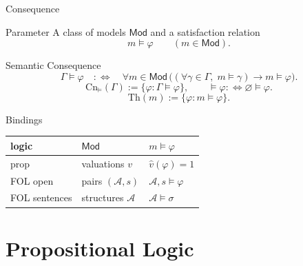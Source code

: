 \documentclass[12pt, a4paper]{report}
\begin{document}
\begin{modelbox}{Consequence}

\begin{modelcomponent}{Parameter}
A class of models \(\mathsf{Mod}\) and a satisfaction relation
\[
  m\models\varphi
  \qquad(m\in\mathsf{Mod}).
\]
\end{modelcomponent}

\begin{modelcomponent}{Semantic Consequence}
\[
  \Gamma\models\varphi
  \quad:\Longleftrightarrow\quad
  \forall m\in\mathsf{Mod}\,
  \bigl((\forall\gamma\in\Gamma,\;m\models\gamma)\to m\models\varphi\bigr).
\]
\[
  \mathrm{Cn}_{\models}(\Gamma):=\{\varphi:\Gamma\models\varphi\},
  \qquad
  \models\varphi:\Longleftrightarrow \varnothing\models\varphi.
\]
\[
  \mathrm{Th}(m):=\{\varphi:m\models\varphi\}.
\]
\end{modelcomponent}

\begin{modelcomponent}{Bindings}
\begin{center}
\begin{tabularx}{\linewidth}{@{}lXX@{}}
\toprule
logic & \(\mathsf{Mod}\) & \(m\models\varphi\) \\
\midrule
prop & valuations \(v\) & \(\widehat v(\varphi)=1\) \\
FOL open & pairs \((\mathcal A,s)\) & \(\mathcal A,s\models\varphi\) \\
FOL sentences & structures \(\mathcal A\) & \(\mathcal A\models\sigma\) \\
\bottomrule
\end{tabularx}
\end{center}
\end{modelcomponent}
\end{modelbox}

\section*{Propositional Logic}
\end{document}
